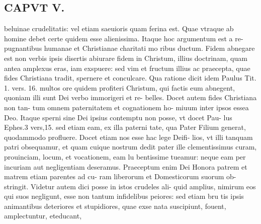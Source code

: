 \documentclass{article}
\begin{document}
\begin{pages}
\section*{CAPVT  V. }
\marginpar{[ p.267 ]}\pstart beluinae crudelitatis: vel etiam saeuioris quam ferina est. Quae vtraque ab homine debet certe quidem esse alienissima. Itaque hoc argumentum est a re- pugnantibus humanae et Christianae charitati mo ribus ductum. Fidem abnegare est non verbis ipsis disertis abiurare fidem in Christum, illius doctrinam, quam antea amplexus eras, iam exspuere: sed vim et fructum illius ac praecepta, quae fides Christiana tradit, spernere et conculcare. Qua ratione dicit idem Paulus Tit. 1. vers. 16. multos ore quidem profiteri Christum, qui factis eum abnegent, quoniam illi sunt Dei verbo immorigeri et re- belles. Docet autem fides Christiana non tan- tum omnem paternitatem et cognationem ho- miuum inter ipsos essea Deo. Itaque sperni sine Dei ipsius contemptu non posse, vt docet Pau- lus Ephes.3 vers,15. sed etiam eam, ex illa paterni tate, qua Pater Filium generat, quodammodo profluere. Docet etiam nos esse hac lege Deifi- lios, vt illi tanquam patri obsequamur, et quam cuique nostrum dedit pater ille clementissimus curam, prouinciam, locum, et vocationem, eam lu bentissime tueamur: neque eam per incuriam aut negligentiam deseramus. Praeceptum enim Dei Honora patrem et matrem etiam parentes ad cu- ram liberorum et Domesticorum suorum ob- stringit. Videtur autem dici posse in istos crudeles ali- quid amplius, nimirum eos qui suos negligunt, esse non tantum infidelibus peiores: sed etiam bru tis ipsis animantibus deteriores et stupidiores, quae exse nata suscipiunt, fouent, amplectuntur, eteducant,  \pend

\end{pages}
\end{document}
